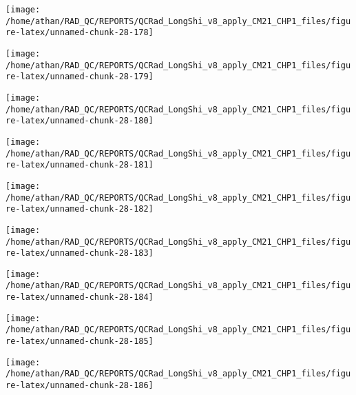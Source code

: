 \documentclass[
  10pt,
  a4paper,oneside]{article}
\begin{document}
\begin{center}\texttt{[image: /home/athan/RAD\_QC/REPORTS/QCRad\_LongShi\_v8\_apply\_CM21\_CHP1\_files/figure-latex/unnamed-chunk-28-178]} \end{center}

\begin{center}\texttt{[image: /home/athan/RAD\_QC/REPORTS/QCRad\_LongShi\_v8\_apply\_CM21\_CHP1\_files/figure-latex/unnamed-chunk-28-179]} \end{center}

\begin{center}\texttt{[image: /home/athan/RAD\_QC/REPORTS/QCRad\_LongShi\_v8\_apply\_CM21\_CHP1\_files/figure-latex/unnamed-chunk-28-180]} \end{center}

\begin{center}\texttt{[image: /home/athan/RAD\_QC/REPORTS/QCRad\_LongShi\_v8\_apply\_CM21\_CHP1\_files/figure-latex/unnamed-chunk-28-181]} \end{center}

\begin{center}\texttt{[image: /home/athan/RAD\_QC/REPORTS/QCRad\_LongShi\_v8\_apply\_CM21\_CHP1\_files/figure-latex/unnamed-chunk-28-182]} \end{center}

\begin{center}\texttt{[image: /home/athan/RAD\_QC/REPORTS/QCRad\_LongShi\_v8\_apply\_CM21\_CHP1\_files/figure-latex/unnamed-chunk-28-183]} \end{center}

\begin{center}\texttt{[image: /home/athan/RAD\_QC/REPORTS/QCRad\_LongShi\_v8\_apply\_CM21\_CHP1\_files/figure-latex/unnamed-chunk-28-184]} \end{center}

\begin{center}\texttt{[image: /home/athan/RAD\_QC/REPORTS/QCRad\_LongShi\_v8\_apply\_CM21\_CHP1\_files/figure-latex/unnamed-chunk-28-185]} \end{center}

\begin{center}\texttt{[image: /home/athan/RAD\_QC/REPORTS/QCRad\_LongShi\_v8\_apply\_CM21\_CHP1\_files/figure-latex/unnamed-chunk-28-186]} \end{center}
\end{document}

